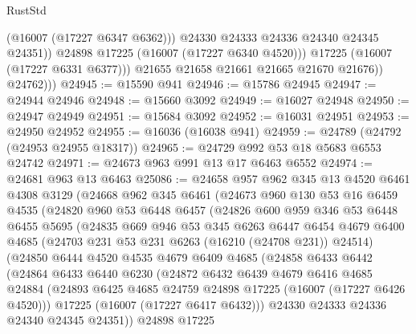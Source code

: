 \begin{lexlean}{RustStd}
\begin{coremodule}
                        (@16007 (@17227 @6347 @6362)))
                      @24330
                      @24333
                      @24336
                      @24340
                      @24345
                      @24351))
                  @24898
                  @17225
                  (@16007 (@17227 @6340 @4520)))
                @17225
                (@16007 (@17227 @6331 @6377)))
              @21655
              @21658
              @21661
              @21665
              @21670
              @21676))
          @24762)))
@24945 := @15590 @941
@24946 := @15786 @24945
@24947 := @24944 @24946
@24948 := @15660 @3092
@24949 := @16027 @24948
@24950 := @24947 @24949
@24951 := @15684 @3092
@24952 := @16031 @24951
@24953 := @24950 @24952
@24955 := @16036 (@16038 @941)
@24959 := @24789 (@24792 (@24953 @24955 @18317))
@24965 := @24729 @992 @53 @18 @5683 @6553 @24742
@24971 := @24673 @963 @991 @13 @17 @6463 @6552
@24974 := @24681 @963 @13 @6463
@25086 := @24658
    @957
    @962
    @345
    @13
    @4520
    @6461
    @4308
    @3129
    (@24668
      @962
      @345
      @6461
      (@24673
        @960
        @130
        @53
        @16
        @6459
        @4535
        (@24820
          @960
          @53
          @6448
          @6457
          (@24826
            @600
            @959
            @346
            @53
            @6448
            @6455
            @5695
            (@24835
              @669
              @946
              @53
              @345
              @6263
              @6447
              @6454
              @4679
              @6400
              @4685
              (@24703 @231 @53 @231 @6263 (@16210 (@24708 @231)) @24514)
              (@24850
                @6444
                @4520
                @4535
                @4679
                @6409
                @4685
                (@24858
                  @6433
                  @6442
                  (@24864
                    @6433
                    @6440
                    @6230
                    (@24872
                      @6432
                      @6439
                      @4679
                      @6416
                      @4685
                      @24884
                      (@24893 @6425 @4685 @24759 @24898 @17225 (@16007 (@17227 @6426 @4520)))
                      @17225
                      (@16007 (@17227 @6417 @6432)))
                    @24330
                    @24333
                    @24336
                    @24340
                    @24345
                    @24351))
                @24898
                @17225

\end{coremodule}
\end{lexlean}
